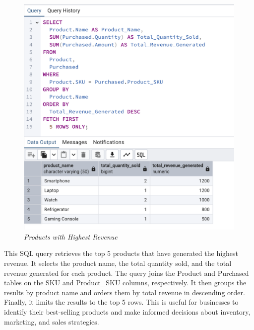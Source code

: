 \begin{figure}[H]
  \centering
  \includegraphics[width=1\textwidth]{images/sql/complex-queries/products_with_highest_revenue.png}
  \caption{\textit{Products with Highest Revenue}}
\end{figure}

This SQL query retrieves the top 5 products that have generated the highest revenue. It selects the product name, the total quantity sold, and the total revenue generated for each product. The query joins the Product and Purchased tables on the SKU and Product\_SKU columns, respectively. It then groups the results by product name and orders them by total revenue in descending order. Finally, it limits the results to the top 5 rows. This is useful for businesses to identify their best-selling products and make informed decisions about inventory, marketing, and sales strategies.




